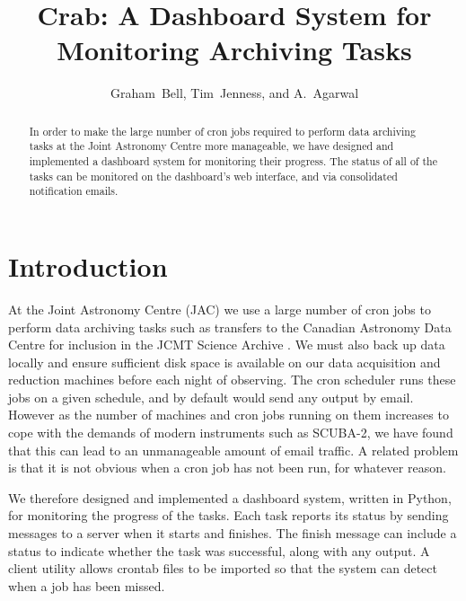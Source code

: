 
\resetcounters




\title{Crab: A Dashboard System for Monitoring Archiving Tasks}
\author{Graham~Bell, Tim~Jenness, and A.~Agarwal
}


\begin{abstract}
In order to make the large number of cron jobs
required to perform data archiving tasks
at the Joint Astronomy Centre more manageable,
we have designed and implemented a dashboard system
for monitoring their progress. 
The status of all of the tasks can be monitored on the dashboard's
web interface, and via consolidated notification emails.
\end{abstract}

\section{Introduction}
At the Joint Astronomy Centre (JAC)
we use a large number of cron jobs to
perform data archiving tasks such as transfers to
the Canadian Astronomy Data Centre
for inclusion in the JCMT Science Archive
\citep{2011ASPC..442..203E}.
We must also back up data locally and
ensure sufficient disk space is available
on our data acquisition and reduction machines
before each night of observing.
The cron scheduler runs these
jobs on a given schedule, and by default would send any output by email.
However as the number of machines and cron jobs
running on them increases to cope with
the demands of modern instruments such as SCUBA-2,
we have found that this can lead to an
unmanageable amount of email traffic.
A related problem is that it is
not obvious when a cron job has not been run, for whatever reason.

We therefore designed and implemented a dashboard system,
written in Python,
for monitoring the progress of the tasks. 
Each task reports its status by sending messages
to a server when it starts and finishes.
The finish message can include a status to indicate whether the task
was successful, along with any output.  
A client utility allows crontab files
to be imported so that the system can detect when a job has been missed.


